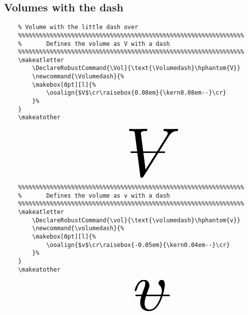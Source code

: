 \documentclass{article}
\begin{document}
\subsection{Volumes with the dash}
\begin{minipage}[t]{0.78\textwidth}
    \begin{verbatim}
    % Volume with the little dash over
    %%%%%%%%%%%%%%%%%%%%%%%%%%%%%%%%%%%%%%%%%%%%%%%%%%%%%%%%%%%%%%%%
    %       Defines the volume as V with a dash
    %%%%%%%%%%%%%%%%%%%%%%%%%%%%%%%%%%%%%%%%%%%%%%%%%%%%%%%%%%%%%%%%
    \makeatletter
        \DeclareRobustCommand{\Vol}{\text{\Volumedash}\hphantom{V}}
        \newcommand{\Volumedash}{%
        \makebox[0pt][l]{%
            \ooalign{$V$\cr\raisebox{0.08em}{\kern0.08em--}\cr}
        }%
    }
    \makeatother
    \end{verbatim}
\end{minipage}
\begin{minipage}[t]{0.18\textwidth}
    \begin{equation*}
        \scalebox{10}{\Vol}
    \end{equation*}
\end{minipage}\newline
\begin{minipage}[t]{0.78\textwidth}
    \begin{verbatim}
    %%%%%%%%%%%%%%%%%%%%%%%%%%%%%%%%%%%%%%%%%%%%%%%%%%%%%%%%%%%%%%%%
    %       Defines the volume as v with a dash
    %%%%%%%%%%%%%%%%%%%%%%%%%%%%%%%%%%%%%%%%%%%%%%%%%%%%%%%%%%%%%%%%
    \makeatletter
        \DeclareRobustCommand{\vol}{\text{\volumedash}\hphantom{v}}
        \newcommand{\volumedash}{%
        \makebox[0pt][l]{%
            \ooalign{$v$\cr\raisebox{-0.05em}{\kern0.04em--}\cr}
        }%
    }
    \makeatother
    \end{verbatim}
\end{minipage}
\begin{minipage}[t]{0.18\textwidth}
    \begin{equation*}
        \scalebox{10}{\vol}
    \end{equation*}
\end{minipage}
\end{document}
